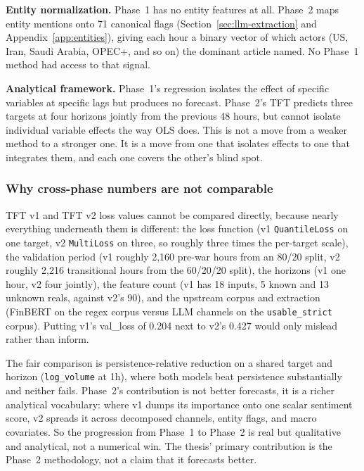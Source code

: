 \textbf{Entity normalization.} Phase~1 has no entity features at all. Phase~2 maps entity mentions onto 71 canonical flags (Section~\ref{sec:llm-extraction} and Appendix~\ref{app:entities}), giving each hour a binary vector of which actors (US, Iran, Saudi Arabia, OPEC+, and so on) the dominant article named. No Phase~1 method had access to that signal.

\textbf{Analytical framework.} Phase~1's regression isolates the effect of specific variables at specific lags but produces no forecast. Phase~2's TFT predicts three targets at four horizons jointly from the previous 48 hours, but cannot isolate individual variable effects the way OLS does. This is not a move from a weaker method to a stronger one. It is a move from one that isolates effects to one that integrates them, and each one covers the other's blind spot.

\subsubsection{Why cross-phase numbers are not comparable}

TFT v1 and TFT v2 loss values cannot be compared directly, because nearly everything underneath them is different: the loss function (v1 \texttt{QuantileLoss} on one target, v2 \texttt{MultiLoss} on three, so roughly three times the per-target scale), the validation period (v1 roughly 2{,}160 pre-war hours from an 80/20 split, v2 roughly 2{,}216 transitional hours from the 60/20/20 split), the horizons (v1 one hour, v2 four jointly), the feature count (v1 has 18 inputs, 5 known and 13 unknown reals, against v2's 90), and the upstream corpus and extraction (FinBERT on the regex corpus versus LLM channels on the \texttt{usable\_strict} corpus). Putting v1's val\_loss of 0.204 next to v2's 0.427 would only mislead rather than inform.

The fair comparison is persistence-relative reduction on a shared target and horizon (\texttt{log\_volume} at 1h), where both models beat persistence substantially and neither fails. Phase~2's contribution is not better forecasts, it is a richer analytical vocabulary: where v1 dumps its importance onto one scalar sentiment score, v2 spreads it across decomposed channels, entity flags, and macro covariates. So the progression from Phase~1 to Phase~2 is real but qualitative and analytical, not a numerical win. The thesis' primary contribution is the Phase~2 methodology, not a claim that it forecasts better.

